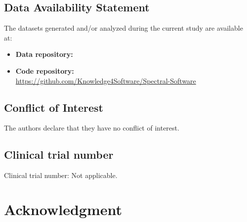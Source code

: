 \documentclass[final,5p,times,twocolumn]{elsarticle}
\theoremstyle{plain}
\begin{document}
\subsection{Data Availability Statement}
The datasets generated and/or analyzed during the current study are available at:
\begin{itemize}
    \item \textbf{Data repository:}\\ 
    \item \textbf{Code repository:}\\ \url{https://github.com/Knowledge4Software/Spectral-Software}
\end{itemize}

\subsection{Conflict of Interest}
The authors declare that they have no conflict of interest.

\subsection{Clinical trial number}
Clinical trial number: Not applicable.

\section{Acknowledgment}
\end{document}
